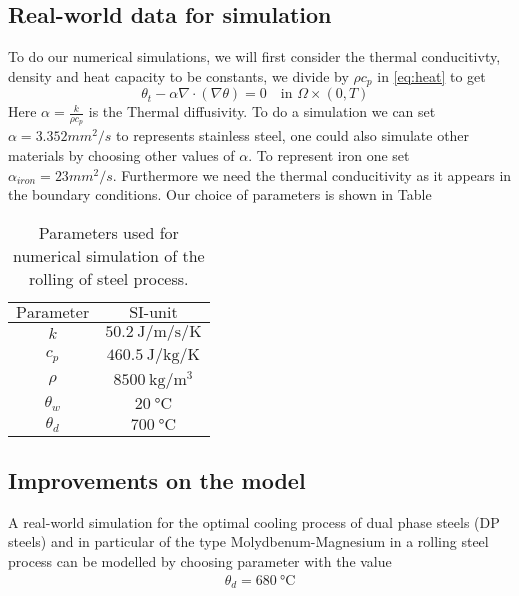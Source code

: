 \subsection{Real-world data for simulation}

To do our numerical simulations, we will first consider the thermal conducitivty, density and heat capacity to be constants, we divide by $\rho c_p$ in \eqref{eq:heat} to get 
\begin{equation*}
    \theta_t - \alpha \nabla \cdot (\nabla \theta) = 0 \quad \text{in $\Omega \times (0,T)$ }
\end{equation*}
Here $\alpha = \frac{k}{\rho c_p}$ is the Thermal diffusivity. To do a simulation we can set $\alpha = 3.352 mm^2/s$ to represents stainless steel, one could also simulate other materials by choosing other values of $\alpha$. To represent iron one set $\alpha_{iron} = 23 mm^2/s$. Furthermore we need the thermal conducitivity as it appears in the boundary conditions. Our choice of parameters is shown in Table 



\begin{table}[h]
    \centering
    \begin{tabular}{c|c}
    $\text{Parameter}$ & $\text{SI-unit}$ \\
    \hline
       $k$& $\SI{50.2}{\joule\per\metre\per\second\per\kelvin}$ \\
        $c_p$ & $\SI{460.5}{\joule\per\kilogram\per\kelvin}$ \\
        $\rho$ & $\SI{8500}{\kilogram\per\metre\cubed}$ \\
        $\theta_w$ & $\SI{20}{\celsius}$ \\
        $\theta_d$ & $\SI{700}{\celsius}$ \\
    \end{tabular}
    \caption{Parameters used for numerical simulation of the rolling of steel process.}
    \label{tab:chosenParam}
\end{table}


\subsection{Improvements on the model}

A real-world simulation for the optimal cooling process of dual phase steels (DP steels) and in particular of the type Molydbenum-Magnesium in a rolling steel process can be modelled by choosing parameter with the value 
\begin{align*}
    \theta_d = \SI{680}{\celsius} \\
\end{align*}


